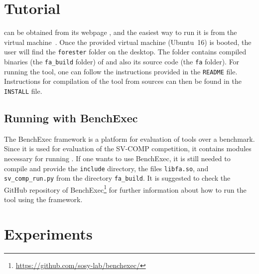 {%


\section{Tutorial}\label{sec:tutorial}

\forester can be obtained from its webpage \cite{foresterweb}, and the
easiest way to run it is from the virtual machine~\cite{zenodo}.
Once the provided virtual machine (Ubuntu~16) is booted, the user will find the \texttt{forester} folder
on the desktop.
The folder contains compiled binaries (the \texttt{fa\_build} folder) of \forester and also its source code (the \texttt{fa} folder).
For running the tool, one can follow the instructions provided in the \texttt{README} file.
Instructions for compilation of the tool from sources can then be found in the \texttt{INSTALL} file.

\subsection{Running \forester{} with BenchExec}

The BenchExec framework is a platform for evaluation of tools over a benchmark.
Since it is used for evaluation of the SV-COMP competition, it contains modules necessary
for running \forester.
If one wants to use BenchExec, it is still needed to compile \forester{} and provide the \texttt{include}
directory, the files \texttt{libfa.so}, and \texttt{sv\_comp\_run.py} from the directory \texttt{fa\_build}.
It is suggested to check the GitHub repository of BenchExec\footnote{\url{https://github.com/sosy-lab/benchexec/}} for further
information about how to run the tool using the framework.



\section{Experiments}\label{sec:exps}

}

